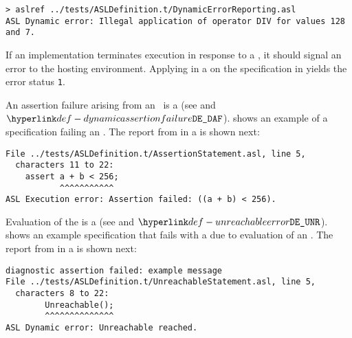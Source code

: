 
\begin{Verbatim}[fontsize=\footnotesize, frame=single]
> aslref ../tests/ASLDefinition.t/DynamicErrorReporting.asl
ASL Dynamic error: Illegal application of operator DIV for values 128 and 7.
\end{Verbatim}

If an implementation terminates execution in response to a \dynamicerrorterm{},
it should signal an error to the hosting environment.
%
Applying \aslref{} in a \linuxbashshell{} on the specification in 
yields the error status \texttt{1}.

An assertion failure arising from an \assertionstatementterm\ is a \dynamicerrorterm{}
(see  and \errorcodeterm{} $\DynamicAssertionFailure$).
%
 shows an example of a specification failing
an \assertionstatementterm{}.
The report from \aslref{} in a \linuxbashshell{} is shown next:
\begin{Verbatim}[fontsize=\footnotesize, frame=single]
File ../tests/ASLDefinition.t/AssertionStatement.asl, line 5,
  characters 11 to 22:
    assert a + b < 256;
           ^^^^^^^^^^^
ASL Execution error: Assertion failed: ((a + b) < 256).
\end{Verbatim}

Evaluation of the \unreachablestatementterm{} is a \dynamicerrorterm{}
(see \SemanticsRuleRef{SUnreachable} and \errorcodeterm{} $\UnreachableError$).
%
 shows an example specification that
fails with a \dynamicerrorsterm{} due to evaluation of an \unreachablestatementterm{}.
The report from \aslref{} in a \linuxbashshell{} is shown next:

\begin{Verbatim}[fontsize=\footnotesize, frame=single]
diagnostic assertion failed: example message
File ../tests/ASLDefinition.t/UnreachableStatement.asl, line 5,
  characters 8 to 22:
        Unreachable();
        ^^^^^^^^^^^^^^
ASL Dynamic error: Unreachable reached.
\end{Verbatim}

